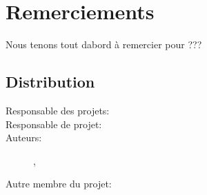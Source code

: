 \documentclass[french]{report}
\begin{document}


\pagestyle{fancyplain}
\renewcommand{\chaptermark}[1]{\markboth{\chaptername\ \thechapter. #1}{}}
\renewcommand{\sectionmark}[1]{\markright{\thesection. #1}}
\lhead[]{\fancyplain{}{\bfseries\leftmark}}
\rhead[]{\fancyplain{}{\bfseries\thepage}}
\cfoot{}
% 
%
\chapter*{Remerciements}
Nous tenons tout dabord à remercier \civiliteResponsableProet{} \responsableProjet{} pour ???


%

\section*{Distribution}
\begin{description}
\item [Responsable des projets:] \responsableDesProjets
\item [Responsable de projet:] \responsableProjet
\item [Auteurs:] \etudiantJP, \etudiantRD
\item [Autre membre du projet:] \etudiantSL
\end{description}
\end{document}
